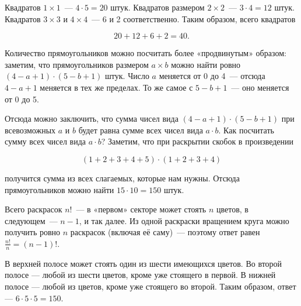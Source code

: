 \begin{itemize}
\itA Квадратов $1 \times 1$~— $4 \cdot 5 = 20$ штук. Квадратов размером $2 \times 2$~— $3 \cdot 4 = 12$ штук. Квадратов $3 \times 3$ и $4 \times 4$~— 6 и 2 соответственно. Таким образом, всего квадратов

$$20 + 12 + 6 + 2 = 40.$$

Количество прямоугольников можно посчитать более «продвинутым» образом: заметим, что прямоугольников размером $a \times b$ можно найти ровно $(4-a+1) \cdot (5-b+1)$ штук. Число $a$ меняется от 0 до 4~— отсюда $4-a+1$ меняется в тех же пределах. То же самое с $5-b+1$~— оно меняется от 0 до 5.

\ms Отсюда можно заключить, что сумма чисел вида $(4-a+1) \cdot (5-b+1)$ при всевозможных $a$ и $b$ будет равна сумме всех чисел вида $a \cdot b$. Как посчитать сумму всех чисел вида $a \cdot b$? Заметим, что при раскрытии скобок в произведении

$$(1+2+3+4+5) \cdot (1+2+3+4)$$

получится сумма из всех слагаемых, которые нам нужны. Отсюда прямоугольников можно найти $15 \cdot 10 = 150$ штук.

\itB Всего раскрасок $n!$~— в «первом» секторе может стоять $n$ цветов, в следующем~— $n-1$, и так далее. Из одной раскраски вращением круга можно получить ровно $n$ раскрасок (включая её саму)~— поэтому ответ равен $\tfrac{n!}{n} = (n-1)!$.

\itC В верхней полосе может стоять один из шести имеющихся цветов. Во второй полосе — любой из шести цветов, кроме уже стоящего в первой. В нижней полосе — любой из цветов, кроме уже стоящего во второй. Таким образом, ответ — $6 \cdot 5 \cdot 5 = 150$.
\end{itemize}